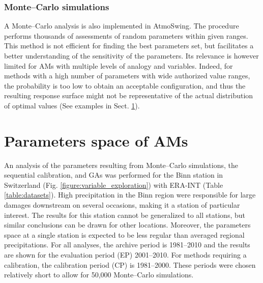 \documentclass[gmdd]{copernicus}
\begin{document}
\subsubsection{Monte--Carlo simulations}
\label{sec:monte-carlo}

A Monte--Carlo analysis is also implemented in AtmoSwing. The procedure performs thousands of assessments of random parameters within given ranges. This method is not efficient for finding the best parameters set, but facilitates a better understanding of the sensitivity of the parameters. Its relevance is however limited for AMs with multiple levels of analogy and variables. Indeed, for methods with a high number of parameters with wide authorized value ranges, the probability is too low to obtain an acceptable configuration, and thus the resulting response surface might not be representative of the actual distribution of optimal values (See examples in Sect. \ref{sec:parameters-space}). 


\section{Parameters space of AMs}
\label{sec:parameters-space}

An analysis of the parameters resulting from Monte--Carlo simulations, the sequential calibration, and GAs was performed for the Binn station in Switzerland (Fig. \ref{figure:variable_exploration}) with ERA-INT (Table \ref{table:datasets}). High precipitation in the Binn region were responsible for large damages downstream on several occasions, making it a station of particular interest. The results for this station cannot be generalized to all stations, but similar conclusions can be drawn for other locations. Moreover, the parameters space at a single station is expected to be less regular than averaged regional precipitations. For all analyses, the archive period is 1981--2010 and the results are shown for the evaluation period (EP) 2001--2010. For methods requiring a calibration, the calibration period (CP) is 1981--2000. These periods were chosen relatively short to allow for 50,000 Monte--Carlo simulations.
\end{document}
